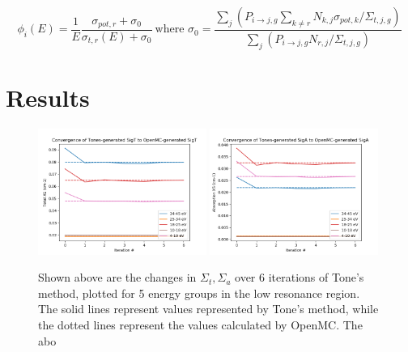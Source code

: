 \documentclass[10pt]{article}
\begin{document}
  \begin{equation}\phi_i(E)=\frac{1}{E}\frac{\sigma_{pot,r}+\sigma_{0}}{\sigma_{t,r}(E)+\sigma_{0}}~\mbox{where }\sigma_{0}=\frac{\sum\limits_j\left(P_{i\rightarrow j,g}\sum\limits_{k\neq r}N_{k,j}\sigma_{pot,k}\Big/\Sigma_{t,j,g}\right) }{\sum\limits_j\left(P_{i\rightarrow j,g}N_{r,j}\Big/\Sigma_{t,j,g}\right)}\end{equation}


  \newpage
  \newpage



  \section{Results}
  \begin{figure}
    \begin{center}
    \includegraphics[width=0.49\textwidth]{convergence_of_tones_sigT}
    \includegraphics[width=0.49\textwidth]{convergence_of_tones_sigA}
    \caption{Shown above are the changes in $\Sigma_t,\Sigma_a$ over 6 iterations of Tone's method, plotted for 5 energy groups in the low resonance region. The solid lines represent values represented by Tone's method, while the dotted lines represent the values calculated by OpenMC. The abo }
    \end{center}
  \end{figure}

  

\end{document}
